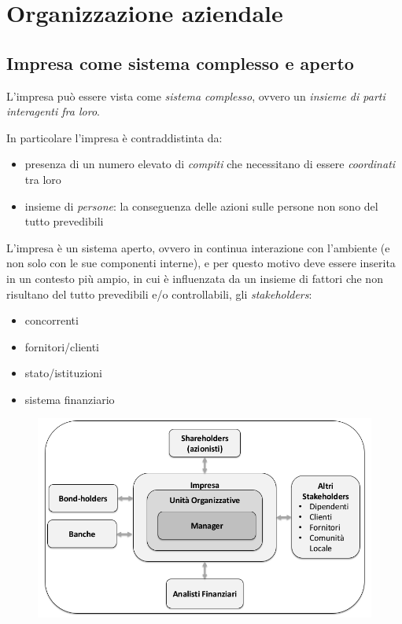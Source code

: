 \chapter{Organizzazione aziendale}

\def\arraystretch{1.5}

\section{Impresa come sistema complesso e aperto}

L'impresa può essere vista come \emph{sistema complesso}, ovvero un \emph{insieme di parti interagenti fra loro}.

In particolare l’impresa è contraddistinta da:
\begin{itemize}
	\item presenza di un numero elevato di \emph{compiti} che necessitano di essere \emph{coordinati} tra loro
	\item insieme di \emph{persone}: la conseguenza delle azioni
	sulle persone non sono del tutto prevedibili
\end{itemize}

L’impresa è un sistema aperto, ovvero in continua interazione
con l’ambiente (e non solo
con le sue componenti interne), e per questo motivo
deve essere inserita in un contesto più ampio, in cui è influenzata da un insieme di fattori che non
risultano del tutto prevedibili e/o controllabili, gli \emph{stakeholders}:
\begin{itemize}
	\item concorrenti
	\item fornitori/clienti
	\item stato/istituzioni
	\item sistema finanziario
\end{itemize}

\begin{figure}[h]
	\centering
	\includegraphics[width=0.5\linewidth]{images/azienda_sistema_aperto}
	\caption[Azienda vista come sistema aperto]{}
	\label{fig:aziendasistemaaperto}
\end{figure}

